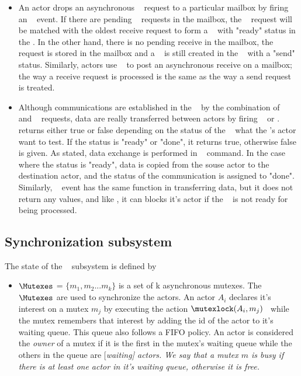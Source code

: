 \documentclass[a4paper,11pt]{article}
\begin{document}
\begin{itemize}[noitemsep]
\setlength{\itemsep}{3pt}
\item An actor drops an asynchronous \send~ request to a particular mailbox by firing an \asynsend~ event. If there are pending \receive~ requests in the mailbox, the \send~ request will be matched with the oldest receive request to form a \communication~ with "ready" status in the \Communications. In the other hand, there is no pending receive in the mailbox, the request is stored in the mailbox and a \communication~ is still created in the \Communications~ with a "send" status.  Similarly, actors use \asynreceive~ to post an asynchronous receive on a mailbox; the way a receive request is processed is the same as the way a send request is treated. 

\item Although communications are established in the \Communications~ by the combination of \send~ and \receive~ requests, data are really transferred between actors by firing \test~ or \wait. \test~ returns either true or false depending on the status of the \communication~ what the \test's actor want to test. If the status is "ready" or "done", it returns true, otherwise false is given. As stated, data exchange is performed in \test~ command. In the case where the status is "ready", data is copied from the souse actor to the destination actor, and the status of the communication is assigned to "done". Similarly, \wait~ event has the same function in transferring data, but  it does not return any values, and like \mutexwait, it can blocks it's actor if the \communication~ is not ready for being processed.   
\end{itemize}

\subsection{Synchronization subsystem}
The state of the \Synchronization~ subsystem is defined by \Mutexes
\begin{itemize}[noitemsep]
\setlength{\itemsep}{3pt}
 \item 
  $\Mutexes$ = $\{m_1, m_2 ... m_k \}$ is a set of k asynchronous mutexes. The $\Mutexes$ are used to synchronize the actors. An actor $A_i$ declares it's interest on a mutex $m_j$ by executing the action $\mutexlock(A_i,m_j)$~  while the mutex remembers that interest by adding the id of the actor to it's waiting queue. This queue also follows a FIFO policy. An actor is considered the {\em owner} of a mutex if it is the first in the mutex's waiting queue while the others in the queue are [\em waiting] actors. We say that a mutex $m$ is {\em busy} if there is at least one actor in it's waiting queue, otherwise it is {\em free}.
 \end{itemize}
\end{document}
